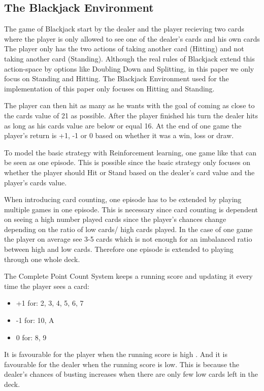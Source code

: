 \documentclass[conference]{IEEEtran}
\begin{document}
\subsection{The Blackjack Environment}
The game of Blackjack start by the dealer and the player recieving two cards where the player is only allowed to see one of the dealer's cards and his own cards
The player only has the two actions of taking another card (Hitting) and not taking another card (Standing). 
Although the real rules of Blackjack extend this action-space by options like Doubling Down and Splitting, in this paper we only focus on Standing and Hitting. 
The Blackjack Environment used for the implementation of this paper only focuses on Hitting and Standing. 

The player can then hit as many as he wants with the goal of coming as close to the cards value of 21 as possible.
After the player finished his turn the dealer hits as long as his cards value are below or equal 16.
At the end of one game the player's return is +1, -1 or 0 based on whether it was a win, loss or draw.

To model the basic strategy with Reinforcement learning, one game like that can be seen as one episode. 
This is possible since the basic strategy only focuses on whether the player should Hit or Stand based on the dealer's card value and the player's cards value.  

When introducing card counting, one episode has to be extended by playing multiple games in one episode. 
This is necessary since card counting is dependent on seeing a high number played cards since the player's chances change depending on the ratio of low cards/ high cards played. 
In the case of one game the player on average see 3-5 cards which is not enough for an imbalanced ratio between high and low cards.
Therefore one episode is extended to playing through one whole deck.

The Complete Point Count System \cite{b1} keeps a running score and updating it every time the player sees a card:
\begin{itemize}
	\item +1 for: 2, 3, 4, 5, 6, 7
	\item -1 for: 10, A
	\item 0 for: 8, 9 
\end{itemize}
It is favourable for the player when the running score is high \cite{b1}.
And it is favourable for the dealer when the running score is low.
This is because the dealer's chances of busting increases when there are only few low cards left in the deck.
\end{document}

